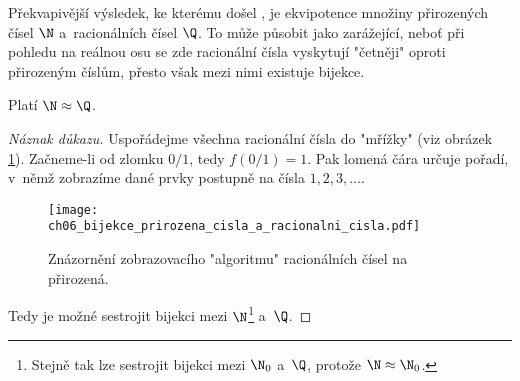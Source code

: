 Překvapivější výsledek, ke kterému došel , je ekvipotence množiny přirozených čísel $\N$ a~racionálních čísel $\Q$. To může působit jako zarážející, neboť při pohledu na reálnou osu se zde racionální čísla vyskytují "četněji" oproti přirozeným číslům, přesto však mezi nimi existuje bijekce.
\begin{theorem}\label{thm:N_a_Q}
    Platí $\N\approx\Q$.
\end{theorem}
\begin{proof}[Náznak důkazu]
    Uspořádejme všechna racionální čísla do "mřížky" (viz obrázek \ref{fig:bijekce_prirozena_cisla_a_racionalni_cisla}). Začneme-li od zlomku $0/1$, tedy $f(0/1)=1$. Pak lomená čára určuje pořadí, v~němž zobrazíme dané prvky postupně na čísla $1,2,3,\dots$.
    \begin{figure}[H]
        \centering
        \texttt{[image: ch06\_bijekce\_prirozena\_cisla\_a\_racionalni\_cisla.pdf]}
        \caption{Znázornění zobrazovacího "algoritmu" racionálních čísel na přirozená.}
        \label{fig:bijekce_prirozena_cisla_a_racionalni_cisla}
    \end{figure}
    Tedy je možné sestrojit bijekci mezi $\N$\footnote{Stejně tak lze sestrojit bijekci mezi $\N_0$ a~$\Q$, protože $\N\approx\N_0$.} a~$\Q$.
\end{proof}
\medskip

